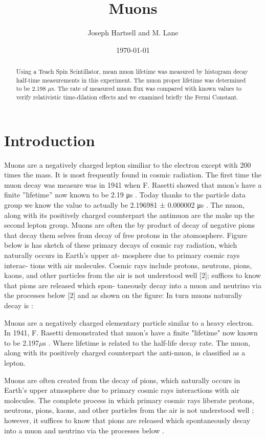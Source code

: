 \documentclass[12pt,twocolumn]{article}
\begin{document}
\title{Muons}
\author{Joseph Hartsell and M. Lane}
\date{\today}

\maketitle


\begin{abstract}
Using a Teach Spin Scintillator, mean muon lifetime was measured by histogram decay half-time measurements in this experiment. The muon proper lifetime was determined to be 2.198 $\mu$s. The rate of
measured muon flux was compared with known values to verify relativistic time-dilation
effects and we examined briefly the Fermi Constant.
\end{abstract}

\section{Introduction}
 Muons are a negatively charged lepton similiar to the electron except with 200 times the mass. It is most frequently found in cosmic radiation.  The first time the muon decay was measure was in 1941 when  F. Rasetti showed that muon’s have a finite ”lifetime” now known to be 2.19 μs \cite{COSBUL}. Today thanks to the particle data group we know the value to actually be 2.196981 ± 0.000002 μs \cite{COSBUL}. The muon, along with its positively charged counterpart the antimuon are the make up the second lepton group.
Muons are often the by product of decay of negative pions that decay them selves from decay of free protons in the atomosphere. Figure below is has sketch of these primary decays of cosmic ray radiation, which naturally occurs in Earth’s upper at- mosphere due to primary cosmic rays interac- tions with air molecules. Cosmic rays include protons, neutrons, pions, kaons, and other particles from the air is not understood well [2]; suffices to know that pions are released which spon- taneously decay into a muon and neutrino via the processes below [2] and as shown on the figure:
In turn muons naturally decay is :

Muons are a negatively charged elementary particle similar to a heavy electron. In 1941,
F. Rasetti demonstrated that muon's have a finite "lifetime" now known to be 2.197$\mu$s
. Where lifetime is related to the half-life decay rate.
The muon, along with its positively charged counterpart the anti-muon, is
classified as a lepton.

Muons are often created from the decay of pions, which naturally occurs in Earth's upper
atmosphere due to primary cosmic rays interactions with air molecules. The complete process
in which primary cosmic rays liberate protons, neutrons, pions, kaons, and other particles
from the air is not understood well \cite{MUON}; however, it suffices to know that pions are released
which spontaneously decay into a muon and neutrino via the processes below \cite{MUON}.
\end{document}
